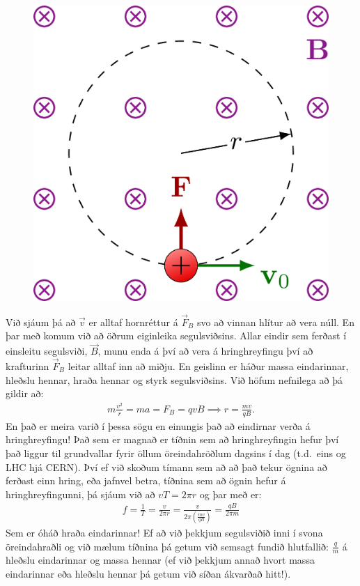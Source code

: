 \ifdefined \wholebook \else\documentclass[oneside]{book}\usepackage{EdlBook}\graphicspath{{figures/}}
\begin{document}
\begin{figure}[H]
    \centering
    \includegraphics[scale = 0.1]{figures/magnetic_field-005.png}
\end{figure}
Við sjáum þá að $\vec{v}$ er alltaf hornréttur á $\vec{F}_B$ svo að vinnan hlítur að vera núll. En þar með komum við að öðrum eiginleika segulsviðsins. Allar eindir sem ferðast í einsleitu segulsviði, $\vec{B}$, munu enda á því að vera á hringhreyfingu því að krafturinn $\vec{F}_B$ leitar alltaf inn að miðju. En geislinn er háður massa eindarinnar, hleðslu hennar, hraða hennar og styrk segulsviðsins. Við höfum nefnilega að þá gildir að:
\begin{align*}
    m \frac{v^2}{r} = ma = F_B = qvB \implies r = \frac{mv}{qB}.
\end{align*}
En það er meira varið í þessa sögu en einungis það að eindirnar verða á hringhreyfingu! Það sem er magnað er tíðnin sem að hringhreyfingin hefur því það liggur til grundvallar fyrir öllum öreindahröðlum dagsins í dag (t.d.~eins og LHC hjá CERN). Því ef við skoðum tímann sem að að það tekur ögnina að ferðast einn hring, eða jafnvel betra, tíðnina sem að ögnin hefur á hringhreyfingunni, þá sjáum við að $v T = 2\pi r$ og þar með er:
\begin{align*}
    f = \frac{1}{T} = \frac{v}{2\pi r} = \frac{v}{2\pi \left( \frac{mv}{qB} \right)} = \frac{qB}{2\pi m}
\end{align*}
Sem er óháð hraða eindarinnar! Ef að við þekkjum segulsviðið inni í svona öreindahraðli og við mælum tíðnina þá getum við semsagt fundið hlutfallið: $\frac{q}{m}$ á hleðslu eindarinnar og massa hennar (ef við þekkjum annað hvort massa eindarinnar eða hleðslu hennar þá getum við síðan ákvarðað hitt!).
\end{document}
